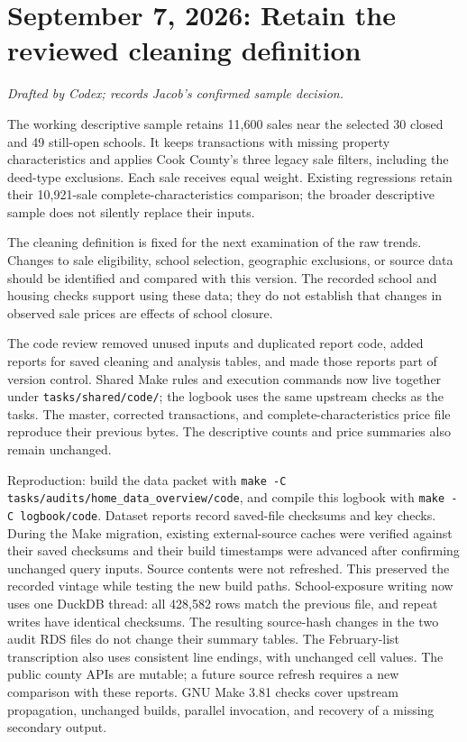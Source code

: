 \section*{September 7, 2026: Retain the reviewed cleaning definition}
\textit{Drafted by Codex; records Jacob's confirmed sample decision.}

The working descriptive sample retains 11,600 sales near the selected
30 closed and 49 still-open schools. It keeps transactions with missing
property characteristics and applies Cook County's three legacy sale filters,
including the deed-type exclusions. Each sale receives equal weight. Existing
regressions retain their 10,921-sale complete-characteristics comparison;
the broader descriptive sample does not silently replace their inputs.

The cleaning definition is fixed for the next examination of the raw trends.
Changes to sale eligibility, school selection, geographic exclusions, or source
data should be identified and compared with this version. The recorded school
and housing checks support using these data; they do not establish that changes
in observed sale prices are effects of school closure.

The code review removed unused inputs and duplicated report code, added reports
for saved cleaning and analysis tables, and made those reports part of version
control. Shared Make rules and execution commands now live together under
\texttt{tasks/shared/code/}; the logbook uses the same upstream checks as the
tasks. The master, corrected transactions, and complete-characteristics price
file reproduce their previous bytes. The descriptive counts and price summaries
also remain unchanged.

\small
Reproduction: build the data packet with \texttt{make -C}
\texttt{tasks/audits/home\_data\_overview/code}, and compile this logbook with
\texttt{make -C logbook/code}. Dataset reports record saved-file checksums and
key checks. During the Make migration, existing external-source caches were
verified against their saved checksums and their build timestamps were advanced
after confirming unchanged query inputs. Source contents were not refreshed.
This preserved the recorded vintage while testing the new build paths.
School-exposure writing now uses one DuckDB thread: all 428,582 rows match the
previous file, and repeat writes have identical checksums. The resulting source-hash
changes in the two audit RDS files do not change their summary tables.
The February-list transcription also uses consistent line endings, with
unchanged cell values.
The public county APIs are mutable; a future source refresh requires a new
comparison with these reports. GNU Make 3.81 checks cover upstream propagation,
unchanged builds, parallel invocation, and recovery of a missing secondary output.
\normalsize
